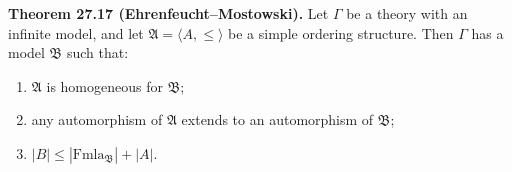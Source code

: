 \textbf{Theorem 27.17 (Ehrenfeucht--Mostowski).}
Let $\Gamma$ be a theory with an infinite model, and let $\mathfrak{A} = \langle A, \leq \rangle$ be a simple ordering structure. Then $\Gamma$ has a model $\mathfrak{B}$ such that:
\begin{enumerate}
\item[(i)] $\mathfrak{A}$ is homogeneous for $\mathfrak{B}$;
\item[(ii)] any automorphism of $\mathfrak{A}$ extends to an automorphism of $\mathfrak{B}$;
\item[(iii)] $|B| \leq |\mathrm{Fmla}_{\mathfrak{B}}| + |A|$.
\end{enumerate}
